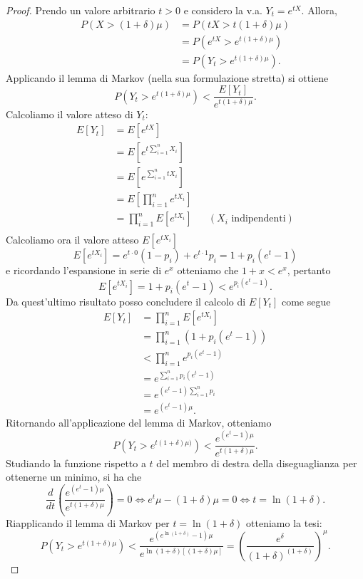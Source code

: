 \begin{proof}
Prendo un valore arbitrario $t>0$ e considero la v.a. $Y_t=e^{tX}$. Allora,
\begin{align*}
P(X>(1+\delta)\mu) &= P(tX>t(1+\delta)\mu) \\
&= P(e^{tX} > e^{t(1+\delta)\mu}) \\
&= P(Y_t > e^{t(1+\delta)\mu}).
\end{align*}
Applicando il lemma di Markov (nella sua formulazione stretta) si ottiene
\[
P(Y_t > e^{t(1+\delta)\mu}) < \frac{E[Y_t]}{e^{t(1+\delta)\mu}}.
\]
Calcoliamo il valore atteso di $Y_t$:
\begin{align*}
E[Y_t]&=E[e^{tX}] \\
&=E[e^{t\sum_{i=1}^{n}X_i}] \\
&=E[e^{\sum_{i=1}^{n}tX_i}] \\
&=E\left[\prod_{i=1}^{n}e^{tX_i}\right] \\
&=\prod_{i=1}^{n}E[e^{tX_i}] && (X_i\text{ indipendenti})\\
\end{align*}
Calcoliamo ora il valore atteso $E[e^{tX_i}]$
\[
E[e^{tX_i}]=e^{t\cdot 0}(1-p_i)+e^{t\cdot 1}p_i=1+p_i(e^t-1)
\]
e ricordando l'espansione in serie di $e^x$ otteniamo che $1+x < e^x$, pertanto
\[
E[e^{tX_i}]=1+p_i(e^t-1)<e^{p_i(e^t-1)}.
\]
Da quest'ultimo risultato posso concludere il calcolo di $E[Y_t]$ come segue
\begin{align*}
E[Y_t]&=\prod_{i=1}^{n}E[e^{tX_i}] \\
&=\prod_{i=1}^{n}(1+p_i(e^t-1)) \\
&< \prod_{i=1}^{n}e^{p_i(e^t-1)} \\
&=e^{\sum_{i=1}^{n}p_i(e^t-1)} \\
&=e^{(e^t-1)\sum_{i=1}^{n}p_i} \\
&=e^{(e^t-1)\mu}.
\end{align*}
Ritornando all'applicazione del lemma di Markov, otteniamo
\[
P(Y_t > e^{t(1+\delta)\mu)}) < \frac{e^{(e^t-1)\mu}}{e^{t(1+\delta)\mu}}.
\]
Studiando la funzione rispetto a $t$ del membro di destra della diseguaglianza per ottenerne un minimo, si ha che
\[
\frac{d}{dt}\left(\frac{e^{(e^t-1)\mu}}{e^{t(1+\delta)\mu}}\right)=0 \Leftrightarrow e^t\mu-(1+\delta)\mu=0 \Leftrightarrow t=\ln(1+\delta).
\]
Riapplicando il lemma di Markov per $t=\ln(1+\delta)$ otteniamo la tesi:
\[
P(Y_t > e^{t(1+\delta)\mu}) < \frac{e^{(e^{\ln(1+\delta)}-1)\mu}}{e^{\ln(1+\delta)[(1+\delta)\mu]}} = \left(\frac{e^\delta}{(1+\delta)^{(1+\delta)}}\right)^\mu.
\]
\end{proof}

